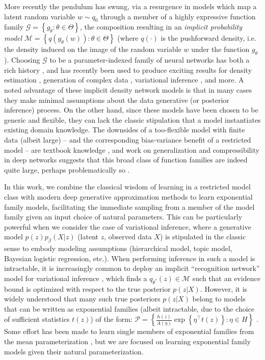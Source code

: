 \documentclass[twoside]{article}
\begin{document}
More recently the pendulum has swung, via a resurgence in models which map a latent random variable $w\sim q_0$ through a member of a highly expressive function family $\mathcal{G} = \left\{g_\theta : \theta \in \Theta\right\}$, the composition resulting in an \emph{implicit probability model} $\mathcal{M} = \left\{ q(g_\theta (w)) : \theta \in \Theta \right\}$ (where $q(\cdot)$ is the pushforward density, i.e. the density induced on the image of the random variable $w$ under the function $g_\theta$).  
Choosing $\mathcal{G}$ to be a parameter-indexed family of neural networks has both a rich history \citep{dayan1995helmholtz,mackay1997density}, and has recently been used to produce exciting results for density estimation \citep{uria2013rnade, rippel2013high, papamakarios2017masked}, generation of complex data \citep{Goodfellow:2014aa}, variational inference \citep{Kingma:2013aa, rezende2014stochastic, titsias2014doubly}, and more.  
A noted advantage of these implicit density network models is that in many cases they make minimal assumptions about the data generative (or posterior inference) process.  
On the other hand, since these models have been chosen to be generic and flexible, they can lack the classic stipulation that a model instantiates existing domain knowledge.  
The downsides of a too-flexible model with finite data (albeit large) -- and the corresponding bias-variance benefit of a restricted model -- are textbook knowledge \citep[\S 7.3]{friedman2001elements}, and work on generalization and compressibility in deep networks suggests that this broad class of function families are indeed quite large, perhaps problematically so \citep{zhou2018compressibility}.  

In this work, we combine the classical wisdom of learning in a restricted model class with modern deep generative approximation methods to learn exponential family models, facilitating the immediate sampling from a member of the model family given an input choice of natural parameters.  This can be particularly powerful when we consider the case of variational inference, where a generative model $p(z)p_\beta(X | z)$ (latent $z$, observed data $X$) is stipulated in the classic sense to embody modeling assumptions (hierarchical model, topic model, Bayesian logistic regression, etc.).  
When performing inference in such a model is intractable, it is increasingly common to deploy an implicit ``recognition network'' model for variational inference \citep{Kingma:2013aa}, which finds a $q_{\theta^*}(z) \in \mathcal{M}$ such that an evidence bound is optimized with respect to the true posterior $p(z|X)$.  
However, it is widely understood that many such true posteriors $p(z|X)$ belong to models that can be written as exponential families (albeit intractable, due to the choice of sufficient statistics $t(z)$) of the form: $\mathcal{P} = \left\{ \frac{h(z)}{A(\eta)} \exp\left\{ \eta^\top t(z) \right \} : \eta \in H \right\}$ \citep{wainwright2008graphical}.
Some effort has been made to learn single members of exponential families from the mean parameterization \citep{loaiza2017maximum}, but we are focused on learning exponential family models given their natural parameterization.
\end{document}
